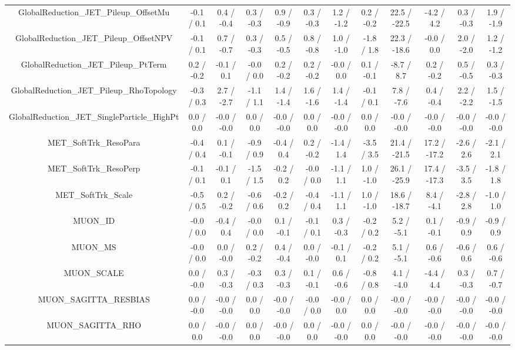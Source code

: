 \begin{table}[htbp]
\begin{center}
\begin{tabular}{|c|c|c|c|c|c|c|c|c|c|c|c|}
  GlobalReduction_JET_Pileup_OffsetMu & -0.1 / 0.1 & 0.4 / -0.4 & 0.3 / -0.3 & 0.9 / -0.9 & 0.3 / -0.3 & 1.2 / -1.2 & 0.2 / -0.2 & 22.5 / -22.5 & -4.2 / 4.2 & 0.3 / -0.3 & 1.9 / -1.9 \\ 
  GlobalReduction_JET_Pileup_OffsetNPV & -0.1 / 0.1 & 0.7 / -0.7 & 0.3 / -0.3 & 0.5 / -0.5 & 0.8 / -0.8 & 1.0 / -1.0 & -1.8 / 1.8 & 22.3 / -18.6 & -0.0 / 0.0 & 2.0 / -2.0 & 1.2 / -1.2 \\ 
  GlobalReduction_JET_Pileup_PtTerm & 0.2 / -0.2 & -0.1 / 0.1 & -0.0 / 0.0 & 0.2 / -0.2 & 0.2 / -0.2 & -0.0 / 0.0 & 0.1 / -0.1 & -8.7 / 8.7 & 0.2 / -0.2 & 0.5 / -0.5 & 0.3 / -0.3 \\ 
  GlobalReduction_JET_Pileup_RhoTopology & -0.3 / 0.3 & 2.7 / -2.7 & -1.1 / 1.1 & 1.4 / -1.4 & 1.6 / -1.6 & 1.4 / -1.4 & -0.1 / 0.1 & 7.8 / -7.6 & 0.4 / -0.4 & 2.2 / -2.2 & 1.5 / -1.5 \\ 
  GlobalReduction_JET_SingleParticle_HighPt & 0.0 / 0.0 & -0.0 / -0.0 & 0.0 / 0.0 & -0.0 / -0.0 & 0.0 / 0.0 & -0.0 / -0.0 & 0.0 / 0.0 & -0.0 / -0.0 & -0.0 / -0.0 & -0.0 / -0.0 & -0.0 / -0.0 \\ 
  MET_SoftTrk_ResoPara & -0.4 / 0.4 & 0.1 / -0.1 & -0.9 / 0.9 & -0.4 / 0.4 & 0.2 / -0.2 & -1.4 / 1.4 & -3.5 / 3.5 & 21.4 / -21.5 & 17.2 / -17.2 & -2.6 / 2.6 & -2.1 / 2.1 \\ 
  MET_SoftTrk_ResoPerp & -0.1 / 0.1 & -0.1 / 0.1 & -1.5 / 1.5 & -0.2 / 0.2 & -0.0 / 0.0 & -1.1 / 1.1 & 1.0 / -1.0 & 26.1 / -25.9 & 17.4 / -17.3 & -3.5 / 3.5 & -1.8 / 1.8 \\ 
  MET_SoftTrk_Scale & -0.5 / 0.5 & 0.2 / -0.2 & -0.6 / 0.6 & -0.2 / 0.2 & -0.4 / 0.4 & -1.1 / 1.1 & 1.0 / -1.0 & 18.6 / -18.7 & 8.4 / -4.1 & -2.8 / 2.8 & -1.0 / 1.0 \\ 
  MUON_ID & -0.0 / 0.0 & -0.4 / 0.4 & -0.0 / 0.0 & 0.1 / -0.1 & -0.1 / 0.1 & 0.3 / -0.3 & -0.2 / 0.2 & 5.2 / -5.1 & 0.1 / -0.1 & -0.9 / 0.9 & -0.9 / 0.9 \\ 
  MUON_MS & -0.0 / 0.0 & 0.0 / -0.0 & 0.2 / -0.2 & 0.4 / -0.4 & 0.0 / -0.0 & -0.1 / 0.1 & -0.2 / 0.2 & 5.1 / -5.1 & 0.6 / -0.6 & -0.6 / 0.6 & 0.6 / -0.6 \\ 
  MUON_SCALE & 0.0 / -0.0 & 0.3 / -0.3 & -0.3 / 0.3 & 0.3 / -0.3 & 0.1 / -0.1 & 0.6 / -0.6 & -0.8 / 0.8 & 4.1 / -4.0 & -4.4 / 4.4 & 0.3 / -0.3 & 0.7 / -0.7 \\ 
  MUON_SAGITTA_RESBIAS & 0.0 / -0.0 & -0.0 / -0.0 & 0.0 / 0.0 & -0.0 / -0.0 & -0.0 / 0.0 & -0.0 / 0.0 & 0.0 / 0.0 & -0.0 / -0.0 & -0.0 / -0.0 & -0.0 / -0.0 & -0.0 / -0.0 \\ 
  MUON_SAGITTA_RHO & 0.0 / 0.0 & -0.0 / -0.0 & 0.0 / 0.0 & -0.0 / -0.0 & 0.0 / 0.0 & -0.0 / -0.0 & 0.0 / 0.0 & -0.0 / -0.0 & -0.0 / -0.0 & -0.0 / -0.0 & -0.0 / -0.0 \\ 

\end{tabular}
\end{center}
\end{table}
